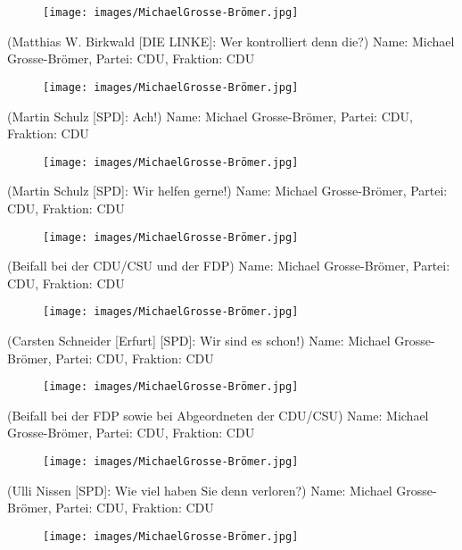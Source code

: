\documentclass[10pt, a4paper]{report}
\begin{document}
\begin{figure}[!ht]
\texttt{[image: images/MichaelGrosse-Brömer.jpg]}
\end{figure}


(Matthias W. Birkwald [DIE LINKE]: Wer kontrolliert denn die?)
Name: Michael Grosse-Brömer, Partei: CDU, Fraktion: CDU

\begin{figure}[!ht]
\texttt{[image: images/MichaelGrosse-Brömer.jpg]}
\end{figure}


(Martin Schulz [SPD]: Ach!)
Name: Michael Grosse-Brömer, Partei: CDU, Fraktion: CDU

\begin{figure}[!ht]
\texttt{[image: images/MichaelGrosse-Brömer.jpg]}
\end{figure}


(Martin Schulz [SPD]: Wir helfen gerne!)
Name: Michael Grosse-Brömer, Partei: CDU, Fraktion: CDU

\begin{figure}[!ht]
\texttt{[image: images/MichaelGrosse-Brömer.jpg]}
\end{figure}


(Beifall bei der CDU/CSU und der FDP)
Name: Michael Grosse-Brömer, Partei: CDU, Fraktion: CDU

\begin{figure}[!ht]
\texttt{[image: images/MichaelGrosse-Brömer.jpg]}
\end{figure}


(Carsten Schneider [Erfurt] [SPD]: Wir sind es schon!)
Name: Michael Grosse-Brömer, Partei: CDU, Fraktion: CDU

\begin{figure}[!ht]
\texttt{[image: images/MichaelGrosse-Brömer.jpg]}
\end{figure}


(Beifall bei der FDP sowie bei Abgeordneten der CDU/CSU)
Name: Michael Grosse-Brömer, Partei: CDU, Fraktion: CDU

\begin{figure}[!ht]
\texttt{[image: images/MichaelGrosse-Brömer.jpg]}
\end{figure}


(Ulli Nissen [SPD]: Wie viel haben Sie denn verloren?)
Name: Michael Grosse-Brömer, Partei: CDU, Fraktion: CDU

\begin{figure}[!ht]
\texttt{[image: images/MichaelGrosse-Brömer.jpg]}
\end{figure}
\end{document}
